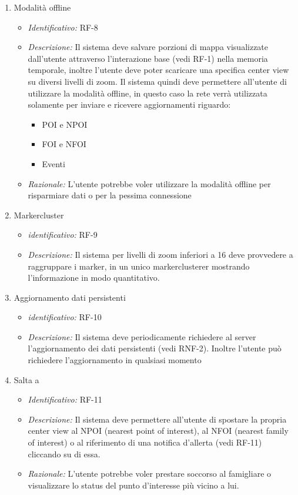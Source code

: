 \begin{enumerate}
    \item Modalità offline
  \begin{itemize}
  \item\textit{Identificativo:} RF-8
  \item\textit{Descrizione:} Il sistema deve salvare porzioni di mappa visualizzate dall’utente attraverso l’interazione base (vedi RF-1) nella memoria temporale, inoltre l’utente deve poter scaricare una specifica center view su diversi livelli di zoom. Il sistema quindi deve permettere all’utente di utilizzare la modalità offline, in questo caso la rete verrà utilizzata solamente per inviare e ricevere aggiornamenti riguardo:
    \begin{itemize}
    \item POI e NPOI
    \item FOI e NFOI
    \item Eventi
    \end{itemize}
   \item\textit{Razionale:} L’utente potrebbe voler utilizzare la modalità offline per risparmiare dati o per la  pessima connessione
  \end{itemize}
  
   \item Markercluster
  \begin{itemize}
  \item\textit{identificativo:} RF-9
  \item\textit{Descrizione:} Il sistema per livelli di zoom inferiori a 16 deve provvedere a raggruppare i marker, in un unico markerclusterer mostrando l’informazione in modo quantitativo.
  \end{itemize}
  
    \item Aggiornamento dati persistenti
  \begin{itemize}
  \item\textit{identificativo:} RF-10
  \item\textit{Descrizione:} Il sistema deve periodicamente richiedere al server l’aggiornamento dei dati persistenti (vedi RNF-2).
Inoltre l’utente può richiedere l’aggiornamento in qualsiasi momento
  \end{itemize}
  
   \item Salta a
  \begin{itemize}
  \item\textit{Identificativo:} RF-11
  \item\textit{Descrizione:} Il sistema deve permettere all’utente di spostare la propria center view al NPOI (nearest point of interest), al NFOI (nearest family of interest) o al riferimento di una notifica d’allerta (vedi RF-11) cliccando su di essa.
   \item\textit{Razionale:} L’utente potrebbe voler prestare soccorso al famigliare o visualizzare lo status del punto d’interesse più vicino a lui.
  \end{itemize}
  

\end{enumerate}
